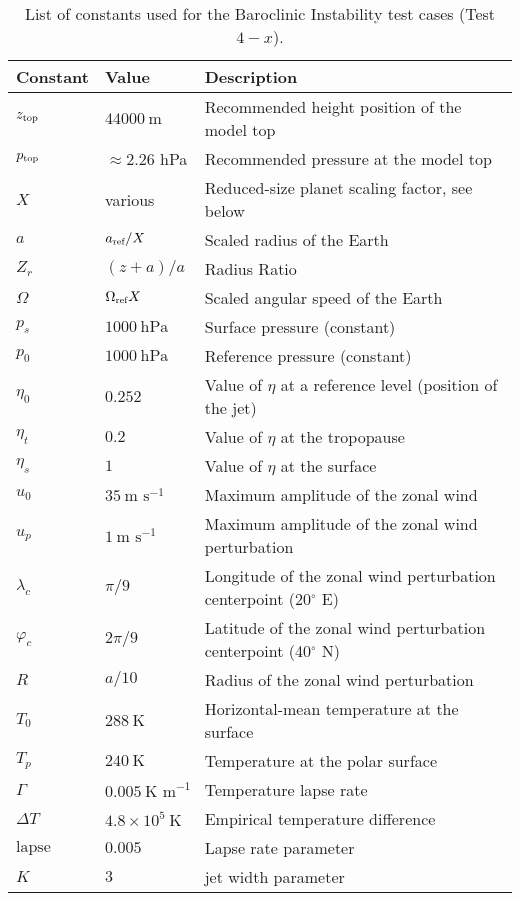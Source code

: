 \documentclass[times,doublespace]{fldauth}
\begin{document}
 
\begin{table}[h]

\caption{List of constants used for the Baroclinic Instability test cases (Test $4-x$).}
\label{test4:tab}
\begin{tabular*}{\textwidth}{@{\extracolsep{\fill}}lll}
\hline Constant & Value & Description \\
\hline 
$z_{\tiny \mbox{top}}$ & $44000\ \mbox{m}$ & Recommended height position of the model top \\
$p_{\tiny \mbox{top}}$ & $\approx 2.26$ hPa & Recommended pressure at the model top\\
$X$ & various & Reduced-size planet scaling factor, see below\\
$a$ & $a_{\tiny \mbox{ref}}/X$ & Scaled radius of the Earth \\
$Z_r$ & $(z+a)/a$ & Radius Ratio\\
$\Omega$ & $\Omega_{\tiny \mbox{ref}}X$ & Scaled angular speed of the Earth \\
$p_s$ & $1000\ \mbox{hPa}$ & Surface pressure (constant) \\
$p_0$ & $1000\ \mbox{hPa}$ & Reference pressure (constant) \\
$\eta_0$ & $0.252$ & Value of $\eta$ at a reference level (position of the jet)\\
$\eta_t$ & $0.2$ & Value of $\eta$ at the tropopause \\
$\eta_s$ & $1$ & Value of $\eta$ at the surface \\
$u_0$ & $35\ \mbox{m\ s}^{-1}$ & Maximum amplitude of the zonal wind \\
$u_p$ & $1\ \mbox{m\ s}^{-1}$ & Maximum amplitude of the zonal wind perturbation \\
$\lambda_c$ & $\pi / 9$ & Longitude of the zonal wind perturbation centerpoint (20$^\circ$ E)\\
$\varphi_c$ & $2 \pi / 9$ & Latitude of the zonal wind perturbation centerpoint (40$^\circ$ N)\\
$R$ & $a / 10$ & Radius of the zonal wind perturbation \\
$T_0$ & $288\ \mbox{K}$ & Horizontal-mean temperature at the surface \\
$T_p$ & $240 \ \mbox{K}$ & Temperature at the polar surface\\
$\Gamma$ & $0.005\ \mbox{K\ m}^{-1}$ & Temperature lapse rate \\
$\Delta T$ & $4.8 \times 10^{5}\ \mbox{K}$ & Empirical temperature difference \\
$\text{lapse}$ & $0.005$ & Lapse rate parameter \\
$K$ & $3$ & jet width parameter \\
\hline 
\end{tabular*}

\end{table}
\end{document}
